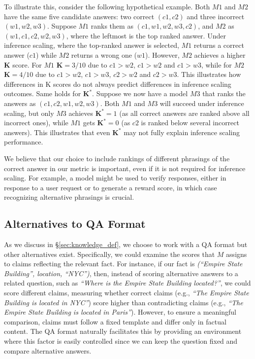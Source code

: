 To illustrate this, consider the following hypothetical example. Both $M1$ and $M2$ have the same five candidate answers: two correct $(c1, c2)$ and three incorrect $(w1, w2, w3)$. Suppose $M1$ ranks them as $(c1, w1, w2, w3, c2)$, and $M2$ as $(w1, c1, c2, w2, w3)$, where the leftmost is the top ranked answer. Under inference scaling, where the top-ranked answer is selected, $M1$ returns a correct answer ($c1$) while $M2$ returns a wrong one ($w1$). However, $M2$ achieves a higher $\mathbf{K}$ score. For $M1$ $\mathbf{K}=3/10$ due to $c1>w2$, $c1>w2$ and $c1>w3$, while for $M2$ $\mathbf{K}=4/10$ due to $c1>w2$, $c1>w3$, $c2>w2$ and $c2>w3$. This illustrates how differences in K scores do not always predict differences in inference scaling outcomes. Same holds for $\mathbf{K^\ast}$. Suppose we now have a model $M3$ that ranks the answers as $(c1, c2, w1, w2, w3)$. Both $M1$ and $M3$ will succeed under inference scaling, but only $M3$ achieves $\mathbf{K^\ast} = 1$ (as all correct answers are ranked above all incorrect ones), while $M1$ gets $\mathbf{K^\ast} = 0$ (as $c2$ is ranked below several incorrect answers). This illustrates that even $\mathbf{K^\ast}$ may not fully explain inference scaling performance.

We believe that our choice to include rankings of different phrasings of the correct answer in our metric is important, even if it is not required for inference scaling. For example, a model might be used to verify responses, either in response to a user request or to generate a reward score, in which case recognizing alternative phrasings is crucial.


\subsection{Alternatives to QA Format}
\label{sec:qa_format}

As we discuss in \S \ref{sec:knowledge_def}, we choose to work with a QA format but other alternatives exist.
Specifically, we could 
examine the scores that $M$ assigns to claims reflecting the relevant fact. For instance, if our fact is {\small \textit{(``Empire State Building'', location, ``NYC'')}}, then, instead of scoring alternative answers to a related question, such as {\small \textit{``Where is the Empire State Building located?''}}, we could score different claims, measuring whether correct claims (e.g., \textit{``The Empire State Building is located in NYC''}) score higher than contradicting claims (e.g., \textit{``The Empire State Building is located in Paris''}). 
However, to ensure a meaningful comparison, claims must follow a fixed template and differ only in factual content. The QA format naturally facilitates this by providing an environment where this factor is easily controlled since we can keep the question fixed and compare alternative answers.


